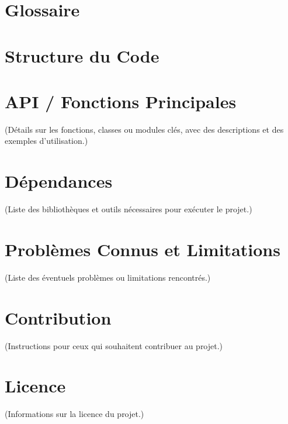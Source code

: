 \documentclass{report}
\begin{document}
\section{Glossaire}

\section{Structure du Code}

\section{API / Fonctions Principales}
(Détails sur les fonctions, classes ou modules clés, avec des descriptions et des exemples d'utilisation.)

\section{Dépendances}
(Liste des bibliothèques et outils nécessaires pour exécuter le projet.)

\section{Problèmes Connus et Limitations}
(Liste des éventuels problèmes ou limitations rencontrés.)

\section{Contribution}
(Instructions pour ceux qui souhaitent contribuer au projet.)

\section{Licence}
(Informations sur la licence du projet.)
\end{document}
